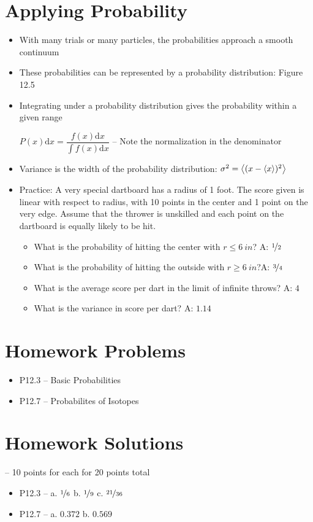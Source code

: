 \documentclass[12pt, openany, letterpaper]{memoir}
\begin{document}
\section*{Applying Probability}
\begin{itemize}
	\item With many trials or many particles, the probabilities approach a smooth continuum
	\item These probabilities can be represented by a probability distribution: Figure 12.5
	\item Integrating under a probability distribution gives the probability within a given range
	
	$P(x)\mathrm{d}x = \dfrac{f(x)\mathrm{d}x}{\int\! f(x)\mathrm{d}x}$ -- Note the normalization in the denominator
	\item Variance is the width of the probability distribution: $\sigma^2 = \left< (x-\left< x \right>)^2 \right>$
	\item Practice: A very special dartboard has a radius of 1 foot. The score given is linear with respect to radius, with 10 points in the center and 1 point on the very edge. Assume that the thrower is unskilled and each point on the dartboard is equally likely to be hit.
	\begin{itemize}
		\item What is the probability of hitting the center with $r\leq 6~in$? A: $\nicefrac{1}{2}$
		\item What is the probability of hitting the outside with $r\geq 6~in$?A: $\nicefrac{3}{4}$
		\item What is the average score per dart in the limit of infinite throws? A: $4$
		\item What is the variance in score per dart? A: $1.14$
	\end{itemize}
\end{itemize}
\section*{Homework Problems}
\begin{itemize}
	\item P12.3 -- Basic Probabilities
	\item P12.7 -- Probabilites of Isotopes
\end{itemize}
\section*{Homework Solutions} -- 10 points for each for 20 points total
\begin{itemize}
	\item P12.3 -- a. $\nicefrac{1}{6}$ b. $\nicefrac{1}{9}$ c. $\nicefrac{21}{36}$
	\item P12.7 -- a. $0.372$ b. $0.569$
\end{itemize}
\end{document}
